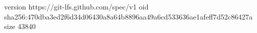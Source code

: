 version https://git-lfs.github.com/spec/v1
oid sha256:470dba3ed2f6d34d06430a8a64b8896aa49a6cd533636ae1afeff7d52c86427a
size 43840
